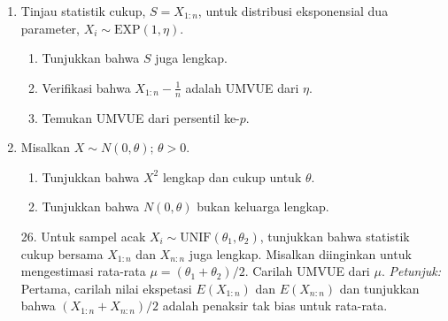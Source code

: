 \documentclass{exam}
\begin{document}
\begin{enumerate}
\begin{solution}
    \end{solution}
    \item Tinjau statistik cukup, \( S = X_{1:n} \), untuk distribusi eksponensial dua parameter, $X_i\sim \text{EXP}(1,\eta)$. 
    \begin{enumerate}
        \item Tunjukkan bahwa \( S \) juga lengkap.
        \item Verifikasi bahwa \( X_{1:n} - \frac{1}{n} \) adalah UMVUE dari \( \eta \).
        \item Temukan UMVUE dari persentil ke-\( p \).
    \end{enumerate}
    
    \item Misalkan \( X \sim N(0, \theta); \, \theta > 0 \).
    \begin{enumerate}
        \item Tunjukkan bahwa \( X^2 \) lengkap dan cukup untuk \( \theta \).
        \item Tunjukkan bahwa \( N(0, \theta) \) bukan keluarga lengkap.
    \end{enumerate}

    \item[26.] Untuk sampel acak $X_i\sim\text{UNIF}(\theta_1,\theta_2)$, tunjukkan bahwa statistik cukup bersama \( X_{1:n} \) dan \( X_{n:n} \) juga lengkap. Misalkan diinginkan untuk mengestimasi rata-rata \( \mu = (\theta_1 + \theta_2)/2 \). Carilah UMVUE dari \( \mu \). \textit{Petunjuk:} Pertama, carilah nilai ekspetasi \( E(X_{1:n}) \) dan \( E(X_{n:n}) \) dan tunjukkan bahwa \( (X_{1:n} + X_{n:n})/2 \) adalah penaksir tak bias untuk rata-rata.
\end{enumerate}
\end{document}
